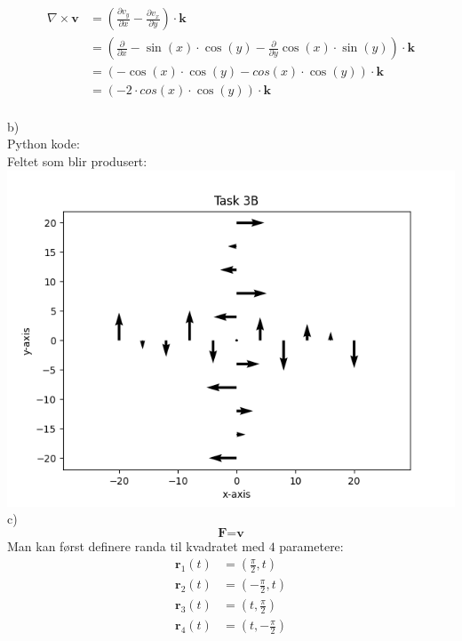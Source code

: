 \documentclass[12pt, a4paper]{article}
\begin{document}
\begin{equation}
    \begin{split}
        \nabla \times \textbf{v} &= \left(\frac{\partial v_y}{\partial x} - \frac{\partial v_x}{\partial y}\right) \cdot \textbf{k} \\
                                 &= \left(\frac{\partial}{\partial x} -\sin(x) \cdot \cos(y) - \frac{\partial}{\partial y} \cos(x) \cdot \sin(y)\right) \cdot \textbf{k} \\
                                 &= (-\cos(x) \cdot \cos(y) - cos(x) \cdot \cos(y)) \cdot \textbf{k} \\
                                 &= (-2 \cdot cos(x) \cdot \cos(y)) \cdot \textbf{k}
    \end{split}
\end{equation}
\\
b) \\
Python kode: \\

Feltet som blir produsert: \\
\hspace*{-1.5cm}
\includegraphics[scale=0.8]{three_b}
\newpage
c) \\
\begin{equation}
    \textbf{F} = \textbf{v}
\end{equation}
Man kan først definere randa til kvadratet med $4$ parametere:
\begin{equation}
    \begin{split}
        \textbf{r}_1(t) &= \left(\frac{\pi}{2}, t \right) \\
        \textbf{r}_2(t) &= \left(-\frac{\pi}{2}, t \right) \\
        \textbf{r}_3(t) &= \left(t, \frac{\pi}{2} \right) \\
        \textbf{r}_4(t) &= \left(t, -\frac{\pi}{2} \right) \\
    \end{split}
\end{equation}
\end{document}
